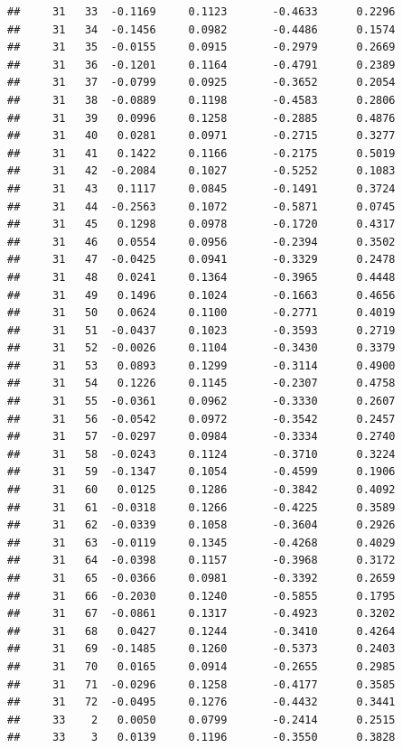 \documentclass[
]{article}
\begin{document}
\begin{verbatim}
##     31   33  -0.1169     0.1123       -0.4633      0.2296 
##     31   34  -0.1456     0.0982       -0.4486      0.1574 
##     31   35  -0.0155     0.0915       -0.2979      0.2669 
##     31   36  -0.1201     0.1164       -0.4791      0.2389 
##     31   37  -0.0799     0.0925       -0.3652      0.2054 
##     31   38  -0.0889     0.1198       -0.4583      0.2806 
##     31   39   0.0996     0.1258       -0.2885      0.4876 
##     31   40   0.0281     0.0971       -0.2715      0.3277 
##     31   41   0.1422     0.1166       -0.2175      0.5019 
##     31   42  -0.2084     0.1027       -0.5252      0.1083 
##     31   43   0.1117     0.0845       -0.1491      0.3724 
##     31   44  -0.2563     0.1072       -0.5871      0.0745 
##     31   45   0.1298     0.0978       -0.1720      0.4317 
##     31   46   0.0554     0.0956       -0.2394      0.3502 
##     31   47  -0.0425     0.0941       -0.3329      0.2478 
##     31   48   0.0241     0.1364       -0.3965      0.4448 
##     31   49   0.1496     0.1024       -0.1663      0.4656 
##     31   50   0.0624     0.1100       -0.2771      0.4019 
##     31   51  -0.0437     0.1023       -0.3593      0.2719 
##     31   52  -0.0026     0.1104       -0.3430      0.3379 
##     31   53   0.0893     0.1299       -0.3114      0.4900 
##     31   54   0.1226     0.1145       -0.2307      0.4758 
##     31   55  -0.0361     0.0962       -0.3330      0.2607 
##     31   56  -0.0542     0.0972       -0.3542      0.2457 
##     31   57  -0.0297     0.0984       -0.3334      0.2740 
##     31   58  -0.0243     0.1124       -0.3710      0.3224 
##     31   59  -0.1347     0.1054       -0.4599      0.1906 
##     31   60   0.0125     0.1286       -0.3842      0.4092 
##     31   61  -0.0318     0.1266       -0.4225      0.3589 
##     31   62  -0.0339     0.1058       -0.3604      0.2926 
##     31   63  -0.0119     0.1345       -0.4268      0.4029 
##     31   64  -0.0398     0.1157       -0.3968      0.3172 
##     31   65  -0.0366     0.0981       -0.3392      0.2659 
##     31   66  -0.2030     0.1240       -0.5855      0.1795 
##     31   67  -0.0861     0.1317       -0.4923      0.3202 
##     31   68   0.0427     0.1244       -0.3410      0.4264 
##     31   69  -0.1485     0.1260       -0.5373      0.2403 
##     31   70   0.0165     0.0914       -0.2655      0.2985 
##     31   71  -0.0296     0.1258       -0.4177      0.3585 
##     31   72  -0.0495     0.1276       -0.4432      0.3441 
##     33    2   0.0050     0.0799       -0.2414      0.2515 
##     33    3   0.0139     0.1196       -0.3550      0.3828 

\end{verbatim}
\end{document}
